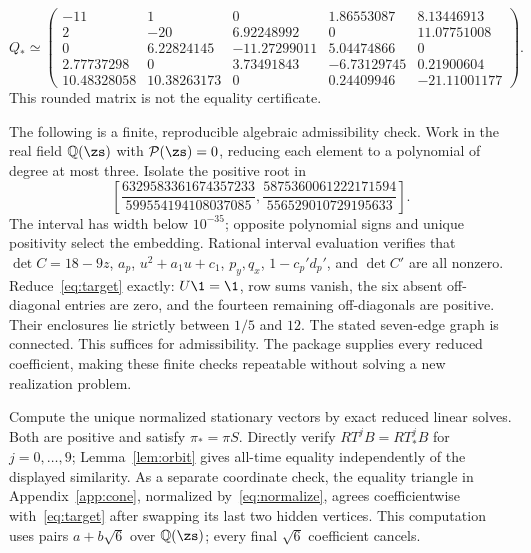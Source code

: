 \begin{equation}
 Q_*\simeq\begin{pmatrix}
 -11&1&0&1.86553087&8.13446913\\
 2&-20&6.92248992&0&11.07751008\\
 0&6.22824145&-11.27299011&5.04474866&0\\
 2.77737298&0&3.73491843&-6.73129745&0.21900604\\
 10.48328058&10.38263173&0&0.24409946&-21.11001177
 \end{pmatrix}.
\end{equation}
This rounded matrix is not the equality certificate.

The following is a finite, reproducible algebraic admissibility check. Work in the real field $\mathbb Q(\zs)$ with $\mathcal P(\zs)=0$, reducing each element to a polynomial of degree at most three. Isolate the positive root in
\begin{equation}
 \left[\frac{6329583361674357233}{599554194108037085},
 \frac{5875360061222171594}{556529010729195633}\right].\label{eq:rootinterval}
\end{equation}
The interval has width below $10^{-35}$; opposite polynomial signs and unique positivity select the embedding. Rational interval evaluation verifies that $\det C=18-9z$, $a_p$, $u^2+a_1u+c_1$, $p_y,q_x$, $1-c_p'd_p'$, and $\det C'$ are all nonzero. Reduce~\eqref{eq:target} exactly: $U\1=\1$, row sums vanish, the six absent off-diagonal entries are zero, and the fourteen remaining off-diagonals are positive. Their enclosures lie strictly between $1/5$ and $12$. The stated seven-edge graph is connected. This suffices for admissibility. The package supplies every reduced coefficient, making these finite checks repeatable without solving a new realization problem.

Compute the unique normalized stationary vectors by exact reduced linear solves. Both are positive and satisfy $\pi_* =\pi S$. Directly verify $RT^jB=RT_*^jB$ for $j=0,\ldots,9$; Lemma~\ref{lem:orbit} gives all-time equality independently of the displayed similarity. As a separate coordinate check, the equality triangle in Appendix~\ref{app:cone}, normalized by~\eqref{eq:normalize}, agrees coefficientwise with~\eqref{eq:target} after swapping its last two hidden vertices. This computation uses pairs $a+b\sqrt6$ over $\mathbb Q(\zs)$; every final $\sqrt6$ coefficient cancels.

